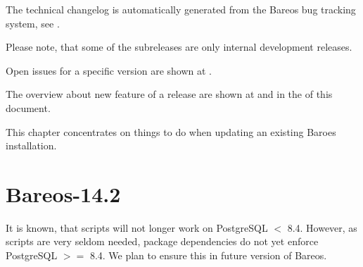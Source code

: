 \label{releasenotes}

The technical changelog is automatically generated from the Bareos bug tracking system, see .

Please note, that some of the subreleases are only internal development releases.

Open issues for a specific version are shown at
.

The overview about new feature of a release are shown at
 and in the  of this document.

This chapter concentrates on things to do when updating an existing Baroes installation.

\section*{Bareos-14.2}

It is known, that  scripts will not longer work on PostgreSQL $<$ 8.4. However, as  scripts are very seldom needed, package dependencies do not yet enforce PostgreSQL $>=$ 8.4.
We plan to ensure this in future version of Bareos.



